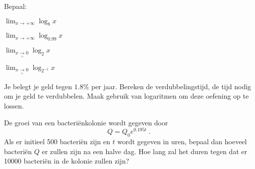 \documentclass[12pt,twoside]{article}
\begin{document}
\begin{oefening}
Bepaal:
\begin{exlist}{2}
  \item $\displaystyle\lim_{x\to +\infty}\log_8 x$
  \item $\displaystyle\lim_{x\to +\infty}\log_{0.99} x$
  \item $\displaystyle\lim_{x\underset{>}{\to} 0}\log_2 x$
  \item $\displaystyle\lim_{x\underset{>}{\to} 0}\log_{2^{-1}} x$
\end{exlist}
\end{oefening}

\begin{oefening}
Je belegt je geld tegen $1.8 \%$ per jaar. Bereken de verdubbelingstijd, de tijd nodig om je geld te verdubbelen. Maak gebruik van logaritmen om deze oefening op te lossen.
\end{oefening}

\begin{oefening} %
De groei van een bacteriënkolonie wordt gegeven door
$$Q=Q_0e^{0.195t}\;.$$
Als er initieel 500 bacteriën zijn en $t$ wordt gegeven in uren, bepaal dan hoeveel bacteriën $Q$ er zullen zijn na een halve dag. Hoe lang zal het duren tegen dat er 10000 bacteriën in de kolonie zullen zijn?
\end{oefening}

\vspace*{-1cm}



\end{document}
